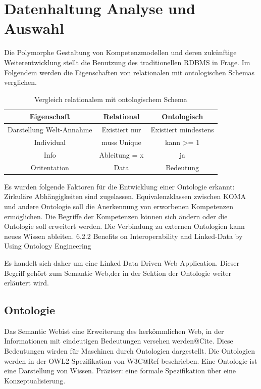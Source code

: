 \documentclass[
12pt,
english,
ngerman,
headsepline,
twoside,
openright,
numbers=noenddot,version=first
]{scrreprt}
\providecommand{\tabularnewline}{\\}
\begin{document}
\section{Datenhaltung Analyse und Auswahl}

Die Polymorphe Gestaltung von Kompetenzmodellen und deren zukünftige Weiterentwicklung stellt die Benutzung des traditionellen RDBMS in Frage. Im Folgendem werden die Eigenschaften von relationalen mit ontologischen Schemas verglichen.


\begin{table}
\caption{Vergleich relationalem mit ontologischem Schema}

\centering{}
\begin{tabular}{ccc}
\noalign{\vskip\doublerulesep}
Eigenschaft & Relational & Ontologisch \tabularnewline[\doublerulesep]
\hline\noalign{\vskip\doublerulesep}
Darstellung Welt-Annahme & Existiert nur & Existiert mindestens \tabularnewline[\doublerulesep]
\noalign{\vskip\doublerulesep}
Individual & muss Unique & kann >= 1 \tabularnewline[\doublerulesep]
\noalign{\vskip\doublerulesep}
Info & Ableitung = x & ja \tabularnewline[\doublerulesep]
\noalign{\vskip\doublerulesep}
Oritentation & Data & Bedeutung \tabularnewline[\doublerulesep]

\end{tabular}
\end{table}

Es wurden folgende Faktoren für die Entwicklung einer Ontologie erkannt:
Zirkuläre Abhängigkeiten sind zugelassen.
Equivalenzklassen zwischen KOMA und andere Ontologie soll die Anerkennung von erworbenen Kompetenzen ermöglichen.
Die Begriffe der Kompetenzen können sich ändern oder die Ontologie soll erweitert werden.
Die Verbindung zu externen Ontologien kann neues Wissen ableiten.
6.2.2 \cite{OntoCloud}Benefits on Interoperability and Linked-Data by Using
Ontology Engineering

Es handelt sich daher um eine \glqq Linked Data Driven Web Application\grqq.%
Dieser Begriff gehört zum \glqq Semantic Web\grqq,der in der Sektion der Ontologie weiter erläutert wird.

\subsection{Ontologie}

Das \glqq Semantic Web\grqq ist eine Erweiterung des herkömmlichen Web, in der Informationen mit eindeutigen Bedeutungen versehen werden@Cite. Diese Bedeutungen wirden für Maschinen durch Ontologien dargestellt. Die Ontologien werden in der OWL2 Spezifikation von W3C@Ref beschrieben.
Eine Ontologie ist eine Darstellung von Wissen. Präziser: eine formale Spezifikation über eine Konzeptualisierung\cite{OntoWhat}.
\end{document}
